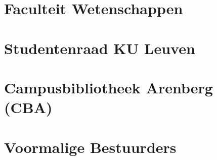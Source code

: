 \documentclass[a4paper,11pt]{article}
\begin{document}
	\section{Faculteit Wetenschappen}
	
	\section{Studentenraad KU Leuven}
	\label{stura}
	
	\section{Campusbibliotheek Arenberg (CBA)}
	
	\section{Voormalige Bestuurders}
	
	
\end{document}
